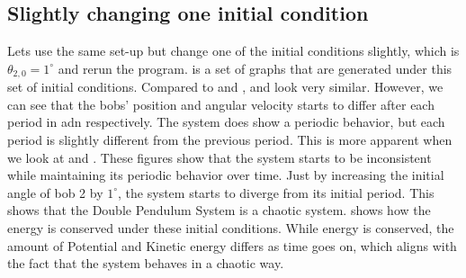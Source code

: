 \subsection{Slightly changing one initial condition}\label{subsec:slightly-changing-one-initial-condition}
Lets use the same set-up but change one of the initial conditions slightly, which is $\theta_{2,0} = 1^\circ$ and rerun the program.  is a set of graphs that are generated under this set of initial conditions. Compared to  and ,  and  look very similar. However, we can see that the bobs' position and angular velocity starts to differ after each period in  adn  respectively. The system does show a periodic behavior, but each period is slightly different from the previous period. This is more apparent when we look at  and . These figures show that the system starts to be inconsistent while maintaining its periodic behavior over time. Just by increasing the initial angle of bob 2 by $1^\circ$, the system starts to diverge from its initial period. This shows that the Double Pendulum System is a chaotic system.  shows how the energy is conserved under these initial conditions. While energy is conserved, the amount of Potential and Kinetic energy differs as time goes on, which aligns with the fact that the system behaves in a chaotic way.

